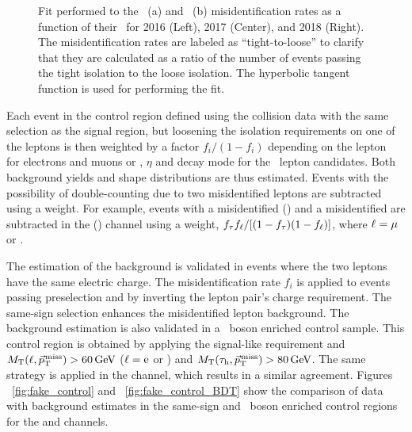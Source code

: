\begin{figure}[htbp]
{  }
  \caption{Fit performed to the \Pgm\, (a) and \Pe\, (b) misidentification rates as a function of their \pt\, for 2016 (Left), 2017 (Center), and 2018 (Right). The misidentification rates are labeled as ``tight-to-loose'' to clarify that they are calculated as a ratio of the number of events passing the tight isolation to the loose isolation. The hyperbolic tangent function is used for performing the fit.}
  \label{fig:fakerate_tauh}
\end{figure}

Each event in the control region defined using the collision data with the same selection as the signal region, but loosening the isolation requirements on one of the leptons is then weighted by a factor $f_i/(1-f_i)$ depending on the lepton \pt\, for electrons and muons or \pt, $\eta$ and decay mode for the \Pgt\, lepton candidates. Both background yields and shape distributions are thus estimated. Events with the possibility of double-counting due to two misidentified leptons are subtracted using a weight. For example, events with a misidentified \Pgm (\Pe) and a misidentified \tauh are subtracted in the \Hmuhad (\Hehad) channel using a weight, $f_{\tau} f_\ell/[(1-f_{\tau})(1-f_\ell)]$, where $\ell = \mu$ or \Pe.

The estimation of the background is validated in events where the two leptons have the same electric charge. The misidentification rate $f_i$ is applied to events passing preselection and by inverting the lepton pair's charge requirement. The same-sign selection enhances the misidentified lepton background. The background estimation is also validated in a \PW\, boson enriched control sample. This control region is obtained by applying the signal-like requirement and $M_\mathrm{T}(\ell, {\vec p}_{\mathrm{T}}^{\kern1pt\text{miss}}) > 60\,\text{Ge\hspace{-.08em}V}$ ($\ell=\text{e}$ or \Pgm) and $M_\mathrm{T}(\tau_{\text{h}}, {\vec p}_{\mathrm{T}}^{\kern1pt\text{miss}}) > 80\,\text{Ge\hspace{-.08em}V}$. The same strategy is applied in the \Hehad channel, which results in a similar agreement. Figures ~\ref{fig:fake_control} and ~\ref{fig:fake_control_BDT} show the comparison of data with background estimates in the same-sign and \PW\, boson enriched control regions for the \Hmuhad and \Hehad channels.

